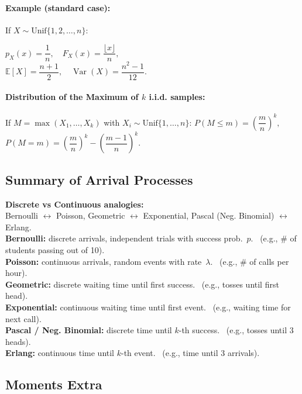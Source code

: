 \paragraph{Example (standard case):}
If $X \sim \text{Unif}\{1, 2, \dots, n\}$:

$p_X(x) = \dfrac{1}{n}, \quad
F_X(x) = \dfrac{\lfloor x \rfloor}{n}, \quad$\\
$\mathbb{E}[X] = \dfrac{n + 1}{2}, \quad
\operatorname{Var}(X) = \dfrac{n^2 - 1}{12}.$


\paragraph{Distribution of the Maximum of $k$ i.i.d. samples:}
If $M = \max(X_1, \dots, X_k)$ with $X_i \sim \text{Unif}\{1, \dots, n\}$:
$P(M \le m) = \left( \dfrac{m}{n} \right)^k,
\qquad$\\
$P(M = m) = \left( \dfrac{m}{n} \right)^k - \left( \dfrac{m - 1}{n} \right)^k.$

\subsection*{Summary of Arrival Processes}

\textbf{Discrete vs Continuous analogies:}\\
Bernoulli $\leftrightarrow$ Poisson, \quad Geometric $\leftrightarrow$ Exponential, \quad Pascal (Neg. Binomial) $\leftrightarrow$ Erlang.\\

\textbf{Bernoulli:} discrete arrivals, independent trials with success prob.~$p$. \ (e.g., \# of students passing out of 10).\\
\textbf{Poisson:} continuous arrivals, random events with rate~$\lambda$. \ (e.g., \# of calls per hour).\\

\textbf{Geometric:} discrete waiting time until first success. \ (e.g., tosses until first head).\\
\textbf{Exponential:} continuous waiting time until first event. \ (e.g., waiting time for next call).\\

\textbf{Pascal / Neg. Binomial:} discrete time until $k$-th success. \ (e.g., tosses until 3 heads).\\
\textbf{Erlang:} continuous time until $k$-th event. \ (e.g., time until 3 arrivals).\\


\subsection*{Moments Extra}

